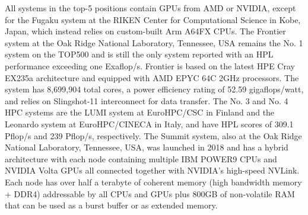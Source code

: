 \par
All systems in the top-5 positions contain GPUs from AMD or NVIDIA, except for the Fugaku system at the RIKEN Center for Computational Science in Kobe, Japan, which instead relies on custom-built Arm A64FX CPUs.
The Frontier system at the Oak Ridge National Laboratory, Tennessee, USA remains the No. 1 system on the TOP500 and is still the only system reported with an HPL performance exceeding one Exaflop/s.
Frontier is based on the latest HPE Cray EX235a architecture and equipped with AMD EPYC 64C 2GHz processors. The system has 8,699,904 total cores, a power efficiency rating of 52.59 gigaflops/watt, and relies on Slingshot-11 interconnect for data transfer.  
The No. 3 and No. 4 HPC systems are the LUMI system at EuroHPC/CSC in Finland and the Leonardo system at EuroHPC/CINECA in Italy, and have HPL scores of 309.1 Pflop/s and 239 Pflop/s, respectively.
The Summit system, also at the Oak Ridge National Laboratory, Tennessee, USA, was launched in 2018 and has a hybrid architecture with each node containing multiple IBM POWER9 CPUs and NVIDIA Volta GPUs all connected together with NVIDIA’s high-speed NVLink.
Each node has over half a terabyte of coherent memory (high bandwidth memory + DDR4) addressable by all CPUs and GPUs plus 800GB of non-volatile RAM that can be used as a burst buffer or as extended memory.

